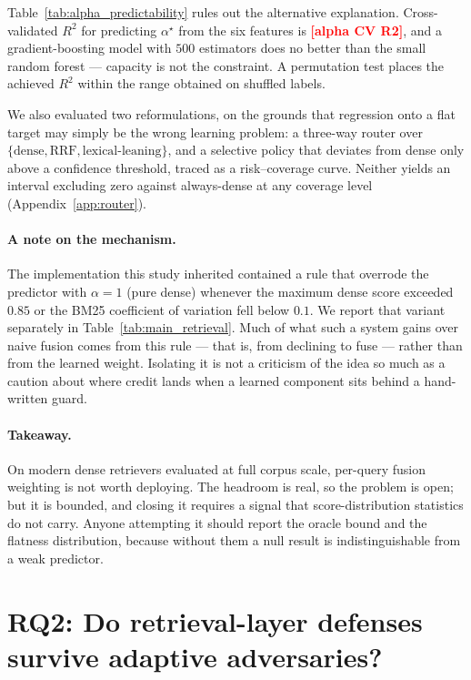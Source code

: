 \documentclass{article}
\providecommand{\PENDING}[1]{\textcolor{red}{\textbf{[#1]}}}
\newcommand{\alphaRtwo}{\PENDING{alpha CV R2}}
\begin{document}
Table~\ref{tab:alpha_predictability} rules out the alternative explanation.
Cross-validated $R^2$ for predicting $\alpha^\star$ from the six features is
\alphaRtwo{}, and a gradient-boosting model with $500$ estimators does no better
than the small random forest --- capacity is not the constraint. A permutation
test places the achieved $R^2$ within the range obtained on shuffled labels.



We also evaluated two reformulations, on the grounds that regression onto a flat
target may simply be the wrong learning problem: a three-way router over
$\{\text{dense}, \text{RRF}, \text{lexical-leaning}\}$, and a selective policy
that deviates from dense only above a confidence threshold, traced as a
risk--coverage curve. Neither yields an interval excluding zero against
always-dense at any coverage level (Appendix~\ref{app:router}).

\paragraph{A note on the mechanism.} The implementation this study inherited
contained a rule that overrode the predictor with $\alpha = 1$ (pure dense)
whenever the maximum dense score exceeded $0.85$ or the BM25 coefficient of
variation fell below $0.1$. We report that variant separately in
Table~\ref{tab:main_retrieval}. Much of what such a system gains over naive
fusion comes from this rule --- that is, from declining to fuse --- rather than
from the learned weight. Isolating it is not a criticism of the idea so much as
a caution about where credit lands when a learned component sits behind a
hand-written guard.

\paragraph{Takeaway.} On modern dense retrievers evaluated at full corpus scale,
per-query fusion weighting is not worth deploying. The headroom is real, so the
problem is open; but it is bounded, and closing it requires a signal that
score-distribution statistics do not carry. Anyone attempting it should report
the oracle bound and the flatness distribution, because without them a null
result is indistinguishable from a weak predictor.

\section{RQ2: Do retrieval-layer defenses survive adaptive adversaries?}
\label{sec:rq2}
\end{document}
